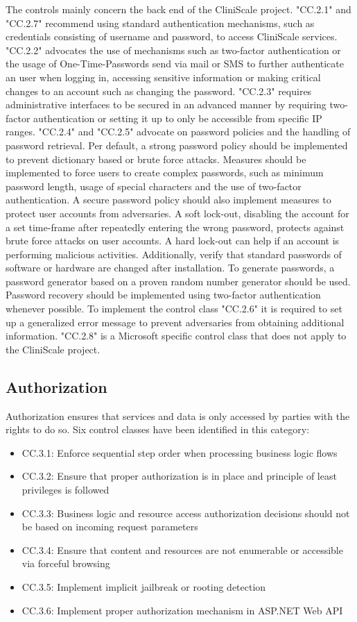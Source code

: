 The controls mainly concern the back end of the CliniScale project. "CC.2.1" and "CC.2.7" recommend using standard authentication mechanisms, such as credentials consisting of username and password, to access CliniScale services. "CC.2.2" advocates the use of mechanisms such as two-factor authentication or the usage of One-Time-Passwords send via mail or SMS to further authenticate an user when logging in, accessing sensitive information or making critical changes to an account such as changing the password. "CC.2.3" requires administrative interfaces to be secured in an advanced manner by requiring two-factor authentication or setting it up to only be accessible from specific IP ranges. "CC.2.4" and "CC.2.5" advocate on password policies and the handling of password retrieval. Per default, a strong password policy should be implemented to prevent dictionary based or brute force attacks. Measures should be implemented to force users to create complex passwords, such as minimum password length, usage of special characters and the use of two-factor authentication. A secure password policy should also implement measures to protect user accounts from adversaries. A soft lock-out, disabling the account for a set time-frame after repeatedly entering the wrong password, protects against brute force attacks on user accounts. A hard lock-out can help if an account is performing malicious activities. Additionally, verify that standard passwords of software or hardware are changed after installation. To generate passwords, a password generator based on a proven random number generator should be used. Password recovery should be implemented using two-factor authentication whenever possible. To implement the control class "CC.2.6" it is required to set up a generalized error message to prevent adversaries from obtaining additional information. "CC.2.8" is a Microsoft specific control class that does not apply to the CliniScale project.

\subsection{Authorization}
Authorization ensures that services and data is only accessed by parties with the rights to do so. Six control classes have been identified in this category:

\begin{itemize}
    \item CC.3.1: Enforce sequential step order when processing business logic flows
    \item CC.3.2: Ensure that proper authorization is in place and principle of least privileges is followed
    \item CC.3.3: Business logic and resource access authorization decisions should not be based on incoming request parameters
    \item CC.3.4: Ensure that content and resources are not enumerable or accessible via forceful browsing
    \item CC.3.5: Implement implicit jailbreak or rooting detection
    \item CC.3.6: Implement proper authorization mechanism in ASP.NET Web API
\end{itemize}

